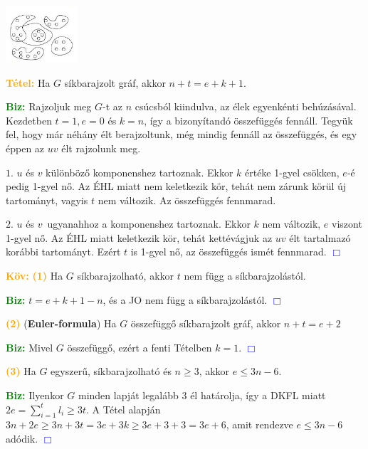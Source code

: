 \documentclass[../../szobeli.tex]{subfiles}
\begin{document}
\begin{itemize}
        \iffalse

            \includegraphics[width=0.2\textwidth]{./img/1.png}

            \textcolor{orange}{\textbf{Tétel:}} Ha $G$ síkbarajzolt gráf, akkor $n+t=e+k+1$. 

            \textcolor{green}{\textbf{Biz:}} Rajzoljuk meg $G$-t az $n$ csúcsból kiindulva, az élek egyenkénti behúzásával. Kezdetben $t=1, e=0$ és $k=n$, így a bizonyítandó összefüggés fennáll. Tegyük fel, hogy már néhány élt berajzoltunk, még mindig fennáll az összefüggés, és egy éppen az $uv$ élt rajzolunk meg.

            $\boxed{1.}$ $u$ és $v$ különböző komponenshez tartoznak. Ekkor $k$ értéke 1-gyel csökken, $e$-é pedig 1-gyel nő. Az ÉHL miatt nem keletkezik kör, tehát nem zárunk körül új tartományt, vagyis $t$ nem változik. Az összefüggés fennmarad.

            $\boxed{2.}$ $u$ és $v$ ugyanahhoz a komponenshez tartoznak. Ekkor $k$ nem változik, $e$ viszont 1-gyel nő. Az ÉHL miatt keletkezik kör, tehát kettévágjuk az $uv$ élt tartalmazó korábbi tartományt. Ezért $t$ is 1-gyel nő, az összefüggés ismét fennmarad. \textcolor{blue}{$\Box$}

            \textcolor{orange}{\textbf{Köv:}} \textcolor{orange}{\textbf{(1)}} Ha $G$ síkbarajzolható, akkor $t$ nem függ a síkbarajzolástól.

            \textcolor{green}{\textbf{Biz:}} $t = e + k + 1 - n$, és a JO nem függ a síkbarajzolástól. \textcolor{blue}{$\Box$}

            \textcolor{orange}{\textbf{(2)}} (\textbf{Euler-formula}) Ha $G$ összefüggő síkbarajzolt gráf, akkor $n + t = e + 2$

            \textcolor{green}{\textbf{Biz:}} Mivel $G$ összefüggő, ezért a fenti Tételben $k = 1$. \textcolor{blue}{$\Box$}

            \textcolor{orange}{\textbf{(3)}} Ha $G$ egyszerű, síkbarajzolható és $n \geq 3$, akkor $e \leq 3n - 6$.

            \textcolor{green}{\textbf{Biz:}} Ilyenkor $G$ minden lapját legalább 3 él határolja, így a DKFL miatt $2e = \sum_{i=1}^{t} l_i \geq 3t$. A Tétel alapján $3n + 2e \geq 3n + 3t = 3e + 3k \geq 3e + 3 + 3 = 3e + 6$, amit rendezve $e \leq 3n - 6$ adódik. \textcolor{blue}{$\Box$}


\end{itemize}
\end{document}
